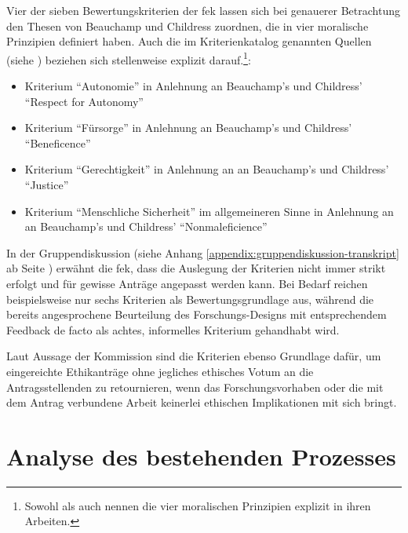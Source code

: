 \documentclass[a4paper,12pt,twoside]{scrreprt}
\begin{document}
\clearpage

Vier der sieben Bewertungskriterien der \ac{fek} lassen sich bei genauerer Betrachtung den Thesen von Beauchamp und Childress zuordnen, die in \cite{beauchamp_principles_1994} vier moralische Prinzipien definiert haben. Auch die im Kriterienkatalog genannten Quellen (siehe \cite[2]{forschungsethik-kommission_der_fachhochschule_vorarlberg_kriterienkatalog_2021}) beziehen sich stellenweise explizit darauf.\footnote{Sowohl \cite{marckmann_was_2000} als auch \cite{schuchter_care_2018} nennen die vier moralischen Prinzipien explizit in ihren Arbeiten.}:
\begin{itemize}
    \item Kriterium \enquote{Autonomie} in Anlehnung an Beauchamp's und Childress' \enquote{Respect for Autonomy} \cite[101-149]{beauchamp_principles_1994}
    \item Kriterium \enquote{Fürsorge} in Anlehnung an Beauchamp's und Childress' \enquote{Beneficence} \cite[202-248]{beauchamp_principles_1994}
    \item Kriterium \enquote{Gerechtigkeit} in Anlehnung an an Beauchamp's und Childress' \enquote{Justice} \cite[249-301]{beauchamp_principles_1994}
    \item Kriterium \enquote{Menschliche Sicherheit} im allgemeineren Sinne in Anlehnung an an Beauchamp's und Childress' \enquote{Nonmaleficience} \cite[150-201]{beauchamp_principles_1994}
\end{itemize}

In der Gruppendiskussion (siehe Anhang \ref{appendix:gruppendiskussion-transkript} ab Seite \pageref{appendix:gruppendiskussion-transkript}) erwähnt die \acl{fek}, dass die Auslegung der Kriterien nicht immer strikt erfolgt und für gewisse Anträge angepasst werden kann. Bei Bedarf reichen beispielsweise nur sechs Kriterien als Bewertungsgrundlage aus, während die bereits angesprochene Beurteilung des Forschungs-Designs mit entsprechendem Feedback de facto als achtes, informelles Kriterium gehandhabt wird.

Laut Aussage der Kommission sind die Kriterien ebenso Grundlage dafür, um eingereichte Ethikanträge ohne jegliches ethisches Votum an die Antragsstellenden zu retournieren, wenn das Forschungsvorhaben oder die mit dem Antrag verbundene Arbeit keinerlei ethischen Implikationen mit sich bringt.

\chapter{Analyse des bestehenden Prozesses}
\label{chap:analyse-bestehender-prozess}
\end{document}
